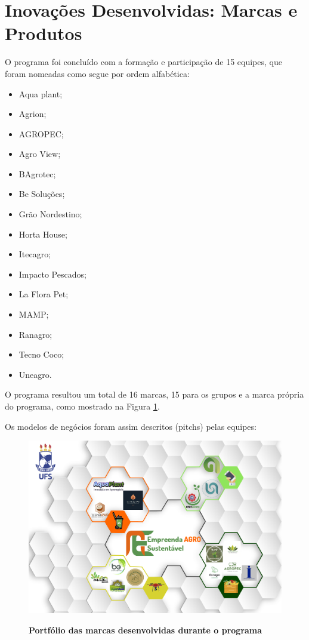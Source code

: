 \section{Inovações Desenvolvidas: Marcas e Produtos}
\label{inovacoes}

O programa foi concluído  com a formação e participação de 15 equipes, que foram nomeadas como segue por ordem alfabética: 

\begin{multicols}{3}
\centering
    \begin{itemize}
\item { Aqua plant;}
\item { Agrion;}
\item { AGROPEC;}
\item { Agro View;}
\item { BAgrotec;}
\item { Be Soluções;}
\item { Grão Nordestino;}
\item { Horta House;}
\item { Itecagro;}
\item { Impacto Pescados;}
\item { La Flora Pet;}
\item { MAMP;}
\item { Ranagro;}
\item { Tecno Coco;}
\item { Uneagro.}
\end{itemize}
\end{multicols}

O programa resultou um total de 16 marcas, 15 para os grupos e a marca própria do programa, como mostrado na Figura \ref{fig_marcas}.

Os modelos de negócios foram assim descritos (pitchs) pelas equipes:
\begin{figure}[H]
\centering
\caption{\textbf{Portfólio das marcas desenvolvidas durante o programa}}
\includegraphics[scale=0.5]{Imagens/portfolio_2.png}
\label{fig_marcas}
\end{figure}


